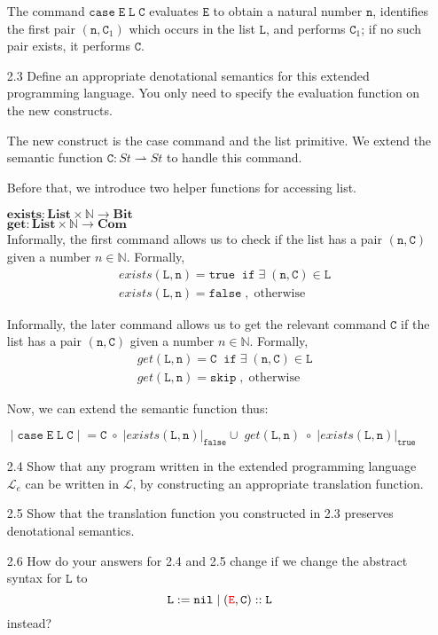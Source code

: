 \documentclass[a4paper,10pt]{article}
\newcommand{\E}{\mathtt{E}}
\newcommand{\C}{\mathtt{C}}
\newcommand{\LL}{\mathtt{L}}
\newcommand{\true}{\mathtt{true}}
\newcommand{\false}{\mathtt{false}}
\newcommand{\ifsym}{\mathtt{if}}
\newcommand{\skipsym}{\mathtt{skip}}
\newcommand{\nil}{\mathtt{nil}}
\newcommand{\case}{\mathtt{case}}
\newcommand{\question}[1]
{\color{DarkBlue}#1 \color{Black} \newline}
\begin{document}
\begin{enumerate}
{The command $\case \; \E \; \LL \; \C$ evaluates $\E$ to obtain a natural number $\mathtt{n}$,
identifies the first pair $(\mathtt{n},\C_1)$ which occurs in the list $\LL$, and performs $\C_1$;
if no such pair exists, it performs $\C$.
}

\question{
\item[2.3] Define an appropriate denotational semantics for this extended programming language. 
You only need to specify the evaluation function on the new constructs.
}

The new construct is the case command and the list primitive.
We extend the semantic function $\C : St \rightharpoonup St$ to handle this
command.

Before that, we introduce two helper functions for accessing list.

$\textbf{exists} : \textbf{List} \times \mathbb{N} \rightarrow \textbf{Bit}$ \\
$\textbf{get} : \textbf{List} \times \mathbb{N} \rightarrow \textbf{Com}$ \\ 

Informally, the first command allows us to check if the list has a pair
$(\mathtt{n},\C)$ given a number $n \in \mathbb{N}$. Formally,
\begin{align*}
& exists(\LL, \mathtt{n}) = \true  \; \; \ifsym \; \exists \; (\mathtt{n},\C)
\in
\LL
\\
& exists(\LL, \mathtt{n}) = \false \; , \; \text{otherwise} 
\end{align*}  

Informally, the later command allows us to get the relevant command $\C$ if the
list has a pair $(\mathtt{n},\C)$ given a number $n \in \mathbb{N}$. Formally,
\begin{align*}
& get(\LL, \mathtt{n}) = \C  \; \; \ifsym \; \exists \; (\mathtt{n},\C) \in
\LL
\\
& get(\LL, \mathtt{n}) = \skipsym \; , \; \text{otherwise} 
\end{align*}  

Now, we can extend the semantic function thus:

$\; | \; \case \; \E \; \LL \; \C \; |\; = 
\C \; \circ \; | exists(\LL, \mathtt{n})|_{\false} \cup \; 
get(\LL, \mathtt{n}) \; \circ \; |exists(\LL, \mathtt{n})|_{\true} $

\question{
\item[2.4] Show that any program written in the extended programming language $\mathcal{L}_e$ 
can be written in $\mathcal{L}$, by constructing an appropriate translation function.
}

\question{
\item[2.5] Show that the translation function you constructed in 2.3 preserves denotational semantics.
}

\question{
\item[2.6] How do your answers for 2.4 and 2.5 change if we change the abstract syntax for $\LL$ to
\[ \LL := \nil \; | \; ({\color{red} \E},\C)::\LL \]
instead?
}

\end{enumerate}
\end{document}
